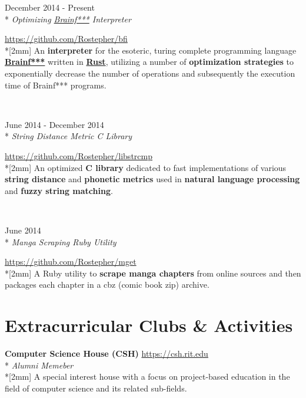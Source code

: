 \documentclass[a4paper,margin,line]{resume}
\newcommand{\rvspace}{2mm} %
\newcommand{\rurl}[1]{\hfill {\footnotesize \url{#1}}}
\newcommand{\rdate}[1]{\hfill {\small #1}}
\newcommand{\rdescription}[1]{\small #1 \normalsize}
\newcommand{\ritem}[5] {
    \item[#1]                               %
    \hfill \rdate{#2} \\*                   %
    \hfill {\small \emph{#3}}               %
    \strut \hfill \rurl{#4} \\*[\rvspace]   %
    \rdescription{#5}                       %
}
\newcommand{\rproject}{\ritem}
\newcommand{\rorganization}[4] {
    \item{\bf #1}                           %
    \rurl{#2} \\*                           %
    \hfill {\small \emph{#3}} \\*[\rvspace] %
    \rdescription{#4}                       %
}
\begin{document}
\begin{resume}
\begin{asparadesc}
    \rproject {bfi}
              {December 2014 - Present}
              {Optimizing \href{http://bit.ly/18Jbb86}
                               {Brainf***} Interpreter}
              {https://github.com/Rostepher/bfi}
    {
        An {\bf interpreter} for the esoteric, turing complete programming
        language \href{http://bit.ly/18Jbb86}{\bf Brainf***}
        written in \href{https://rust-lang.org}{\bf Rust}, utilizing a
        number of {\bf optimization strategies} to exponentially decrease
        the number of operations and subsequently the execution time of
        Brainf*** programs.
    }
    \\

    \rproject {libstrcmp}
              {June 2014 - December 2014}
              {String Distance Metric C Library}
              {https://github.com/Rostepher/libstrcmp}
    {
        An optimized {\bf C library} dedicated to fast implementations of
        various {\bf string distance} and {\bf phonetic metrics} used
        in {\bf natural language processing} and {\bf fuzzy string matching}.
    }
    \\

    \rproject {mget}
              {June 2014}
              {Manga Scraping Ruby Utility}
              {https://github.com/Rostepher/mget}
    {
        A Ruby utility to {\bf scrape manga chapters} from online sources
        and then packages each chapter in a cbz (comic book zip) archive.
    }
\end{asparadesc}

\section{\mysidestyle Extracurricular Clubs \& Activities}
\begin{asparablank}
    \rorganization {Computer Science House ({\small CSH})}
                   {https://csh.rit.edu}
                   {Alumni Memeber}
    {
        A special interest house with a focus on project-based education in
        the field of computer science and its related sub-fields.
    }
\end{asparablank}

\end{resume}
\end{document}
